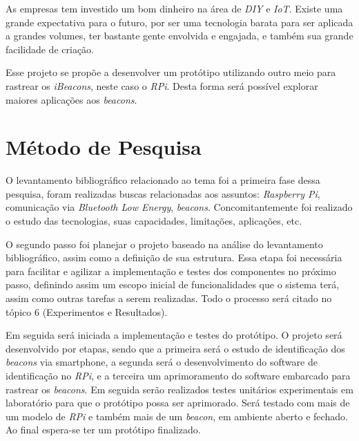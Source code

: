 \documentclass[
	12pt,				%
	openright,			%
	oneside,			%
	a4paper,			%
	chapter=TITLE,		%
	english,			%
	brazil				%
	]{abntex2}
\begin{document}
{As empresas tem investido um bom dinheiro na área de \textit{DIY} e \textit{IoT}. Existe uma grande expectativa para o futuro, por ser uma tecnologia barata para ser aplicada a grandes volumes, ter bastante gente envolvida e engajada, e também sua grande facilidade de criação.

Esse projeto se propõe a desenvolver um protótipo utilizando outro meio para rastrear os \textit{iBeacons}, neste caso o \textit{RPi}. Desta forma será possível explorar maiores aplicações aos \textit{beacons}.



\chapter{Método de Pesquisa}

O levantamento bibliográfico relacionado ao tema foi a primeira fase dessa pesquisa, foram realizadas buscas relacionadas aos assuntos: \textit{Raspberry Pi}, comunicação via \textit{Bluetooth Low Energy}, \textit{beacons}. Concomitantemente foi realizado o estudo das tecnologias, suas capacidades, limitações, aplicações, etc.

O segundo passo foi planejar o projeto baseado na análise do levantamento bibliográfico, assim como a definição de sua estrutura. Essa etapa foi necessária para facilitar e agilizar a implementação e testes dos componentes no próximo passo, definindo assim um escopo inicial de funcionalidades que o sistema terá, assim como outras tarefas a serem realizadas. Todo o processo será citado no tópico 6 (Experimentos e Resultados).

Em seguida será iniciada a implementação e testes do protótipo. O projeto será desenvolvido por etapas, sendo que a primeira será o estudo de identificação dos \textit{beacons} via smartphone, a segunda será o desenvolvimento do software de identificação no \textit{RPi}, e a terceira um aprimoramento do software embarcado para rastrear os \textit{beacons}. Em seguida serão realizados testes unitários experimentais em laboratório para que o protótipo possa ser aprimorado. Será testado com mais de um modelo de \textit{RPi} e também mais de um \textit{beacon}, em ambiente aberto e fechado. Ao final espera-se ter um protótipo finalizado.

}
\end{document}

